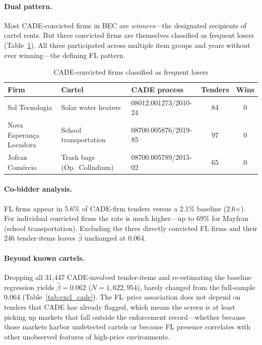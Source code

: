 \paragraph{Dual pattern.}
Most CADE-convicted firms in BEC are \emph{winners}---the designated
recipients of cartel rents. But three convicted firms are themselves
classified as frequent losers (Table~\ref{tab:cade_fl_firms}). All
three participated across multiple item groups and years without ever
winning---the defining FL pattern.

\begin{table}[htbp]
\centering
\caption{CADE-convicted firms classified as frequent losers}
\label{tab:cade_fl_firms}
\small
\begin{tabular}{lllcc}
\toprule
Firm & Cartel & CADE process & Tenders & Wins \\
\midrule
Sol Tecnologia & Solar water heaters & 08012.001273/2010-24 & 84 & 0 \\
Nova Esperan\c{c}a Locadora & School transportation & 08700.005876/2019-85 & 97 & 0 \\
Jofran Com\'ercio & Trash bags (Op.\ Colludium) & 08700.005789/2015-02 & 65 & 0 \\
\bottomrule
\end{tabular}
\end{table}

\paragraph{Co-bidder analysis.}
FL firms appear in 5.6\% of CADE-firm tenders versus a 2.1\% baseline
(2.6$\times$). For individual convicted firms the rate is much
higher---up to 69\% for Mayfran (school transportation). Excluding
the three directly convicted FL firms and their 246 tender-items
leaves $\hat{\beta}$ unchanged at 0.064.

\paragraph{Beyond known cartels.}
Dropping all 31,447 CADE-involved tender-items and re-estimating the
baseline regression yields $\hat{\beta} = 0.062$ ($N =
1{,}622{,}954$), barely changed from the full-sample 0.064
(Table~\ref{tab:excl_cade}). The FL--price association does not
depend on tenders that CADE has already flagged, which means the
screen is at least picking up markets that fall outside the
enforcement record---whether because those markets harbor undetected
cartels or because FL presence correlates with other unobserved
features of high-price environments.

